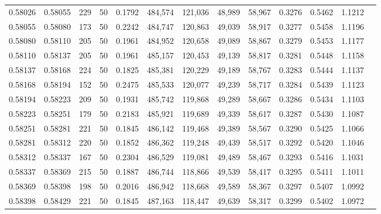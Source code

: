 \begin{tabular}{rrrrrrrrrrrrr}
0.58026 & 0.58055 &   229 &  50 &                                     0.1792 & 484,574 & 121,036 &  48,989 &  58,967 & 0.3276 & 0.5462 & 1.1212 \\
0.58055 & 0.58080 &   173 &  50 &                                     0.2242 & 484,747 & 120,863 &  49,039 &  58,917 & 0.3277 & 0.5458 & 1.1196 \\
0.58080 & 0.58110 &   205 &  50 &                                     0.1961 & 484,952 & 120,658 &  49,089 &  58,867 & 0.3279 & 0.5453 & 1.1177 \\
0.58110 & 0.58137 &   205 &  50 &                                     0.1961 & 485,157 & 120,453 &  49,139 &  58,817 & 0.3281 & 0.5448 & 1.1158 \\
0.58137 & 0.58168 &   224 &  50 &                                     0.1825 & 485,381 & 120,229 &  49,189 &  58,767 & 0.3283 & 0.5444 & 1.1137 \\
0.58168 & 0.58194 &   152 &  50 &                                     0.2475 & 485,533 & 120,077 &  49,239 &  58,717 & 0.3284 & 0.5439 & 1.1123 \\
0.58194 & 0.58223 &   209 &  50 &                                     0.1931 & 485,742 & 119,868 &  49,289 &  58,667 & 0.3286 & 0.5434 & 1.1103 \\
0.58223 & 0.58251 &   179 &  50 &                                     0.2183 & 485,921 & 119,689 &  49,339 &  58,617 & 0.3287 & 0.5430 & 1.1087 \\
0.58251 & 0.58281 &   221 &  50 &                                     0.1845 & 486,142 & 119,468 &  49,389 &  58,567 & 0.3290 & 0.5425 & 1.1066 \\
0.58281 & 0.58312 &   220 &  50 &                                     0.1852 & 486,362 & 119,248 &  49,439 &  58,517 & 0.3292 & 0.5420 & 1.1046 \\
0.58312 & 0.58337 &   167 &  50 &                                     0.2304 & 486,529 & 119,081 &  49,489 &  58,467 & 0.3293 & 0.5416 & 1.1031 \\
0.58337 & 0.58369 &   215 &  50 &                                     0.1887 & 486,744 & 118,866 &  49,539 &  58,417 & 0.3295 & 0.5411 & 1.1011 \\
0.58369 & 0.58398 &   198 &  50 &                                     0.2016 & 486,942 & 118,668 &  49,589 &  58,367 & 0.3297 & 0.5407 & 1.0992 \\
0.58398 & 0.58429 &   221 &  50 &                                     0.1845 & 487,163 & 118,447 &  49,639 &  58,317 & 0.3299 & 0.5402 & 1.0972 \\

\end{tabular}
